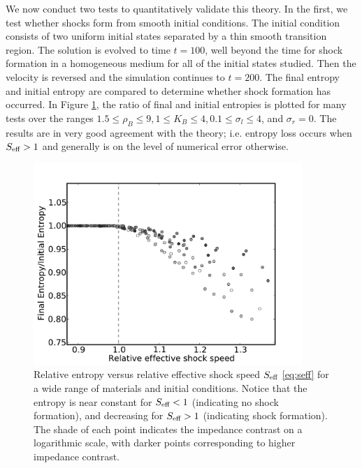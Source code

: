 We now conduct two tests to quantitatively validate this theory.
In the first, we test whether shocks form from smooth initial conditions.
The initial condition consists of
two uniform initial states separated by a thin smooth transition region.
The solution is evolved to time $t=100$, well beyond
the time for shock formation in a homogeneous medium for all of the initial
states studied.  Then the velocity
is reversed and the simulation continues to $t=200$.  The final entropy 
and initial entropy are compared to determine whether shock formation has
occurred.  In Figure \ref{fig:ent_cshock}, the ratio of final and initial 
entropies is plotted for many tests over the ranges 
$1.5\le\rho_B\le 9,1\le K_B \le 4,0.1\le\sigma_l\le4$, 
and $\sigma_r=0$.  The results are in very good agreement with the theory;
i.e. entropy loss occurs when $S_\textup{eff}>1$
and generally is on the level of numerical error otherwise.  

\begin{figure}
\centerline{
\includegraphics[width=4in]{figures/ent_cshock.pdf}}
\caption{Relative entropy versus relative effective shock speed $S_\textup{eff}$
\eqref{eq:seff} 
for a wide range of materials and initial conditions.  Notice that the 
entropy is near constant for $S_\textup{eff}<1$ (indicating
no shock formation), and decreasing for $S_\textup{eff}>1$ (indicating
shock formation).  The shade of each point indicates the impedance contrast
on a logarithmic scale, with darker points corresponding to higher impedance
contrast.
\label{fig:ent_cshock}}
\end{figure}


